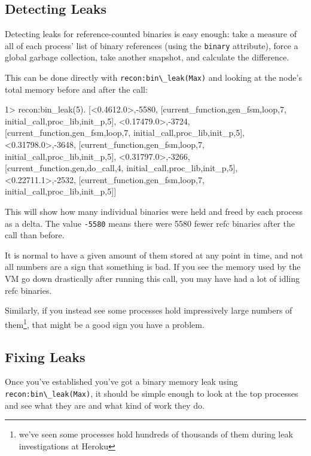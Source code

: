 \documentclass[11pt, oneside]{book}   	%
\newcommand{\function}[1]{\Verb`#1`}
\newcommand{\expression}[1]{\Verb`#1`}
\begin{document}
\subsection{Detecting Leaks}

Detecting leaks for reference-counted binaries is easy enough: take a measure of all of each process' list of binary references (using the \expression{binary} attribute), force a global garbage collection, take another snapshot, and calculate the difference.

This can be done directly with \function{recon:bin\_leak(Max)} and looking at the node's total memory before and after the call:

\begin{VerbatimEshell}
1> recon:bin_leak(5).
[{<0.4612.0>,-5580,
  [{current_function,{gen_fsm,loop,7}},
   {initial_call,{proc_lib,init_p,5}}]},
 {<0.17479.0>,-3724,
  [{current_function,{gen_fsm,loop,7}},
   {initial_call,{proc_lib,init_p,5}}]},
 {<0.31798.0>,-3648,
  [{current_function,{gen_fsm,loop,7}},
   {initial_call,{proc_lib,init_p,5}}]},
 {<0.31797.0>,-3266,
  [{current_function,{gen,do_call,4}},
   {initial_call,{proc_lib,init_p,5}}]},
 {<0.22711.1>,-2532,
  [{current_function,{gen_fsm,loop,7}},
   {initial_call,{proc_lib,init_p,5}}]}]
\end{VerbatimEshell}

This will show how many individual binaries were held and freed by each process as a delta. The value \expression{-5580} means there were 5580 fewer refc binaries after the call than before.

It is normal to have a given amount of them stored at any point in time, and not all numbers are a sign that something is bad. If you see the memory used by the VM go down drastically after running this call, you may have had a lot of idling refc binaries.

Similarly, if you instead see some processes hold impressively large numbers of them\footnote{we've seen some processes hold hundreds of thousands of them during leak investigations at Heroku}, that might be a good sign you have a problem.

\subsection{Fixing Leaks}

Once you've established you've got a binary memory leak using \function{recon:bin\_leak(Max)}, it should be simple enough to look at the top processes and see what they are and what kind of work they do.
\end{document}
